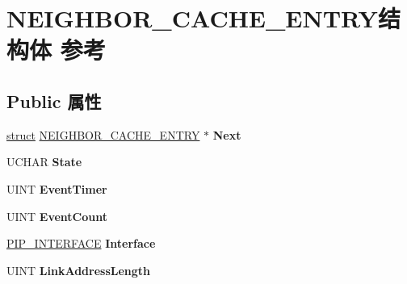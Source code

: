 \hypertarget{struct_n_e_i_g_h_b_o_r___c_a_c_h_e___e_n_t_r_y}{}\section{N\+E\+I\+G\+H\+B\+O\+R\+\_\+\+C\+A\+C\+H\+E\+\_\+\+E\+N\+T\+R\+Y结构体 参考}
\label{struct_n_e_i_g_h_b_o_r___c_a_c_h_e___e_n_t_r_y}
\subsection*{Public 属性}
\begin{DoxyCompactItemize}
\item 
\mbox{\label{struct_n_e_i_g_h_b_o_r___c_a_c_h_e___e_n_t_r_y_a687396e9a1ff02dbd81f290768274cf5}} 
\hyperlink{interfacestruct}{struct} \hyperlink{struct_n_e_i_g_h_b_o_r___c_a_c_h_e___e_n_t_r_y}{N\+E\+I\+G\+H\+B\+O\+R\+\_\+\+C\+A\+C\+H\+E\+\_\+\+E\+N\+T\+RY} $\ast$ {\bfseries Next}
\item 
\mbox{\label{struct_n_e_i_g_h_b_o_r___c_a_c_h_e___e_n_t_r_y_a7845157ad6f438f93650472e91eb9b49}} 
U\+C\+H\+AR {\bfseries State}
\item 
\mbox{\label{struct_n_e_i_g_h_b_o_r___c_a_c_h_e___e_n_t_r_y_a8cbe8f2c844743f428785ea9388fbaa1}} 
U\+I\+NT {\bfseries Event\+Timer}
\item 
\mbox{\label{struct_n_e_i_g_h_b_o_r___c_a_c_h_e___e_n_t_r_y_af28a74fa28e26b6522b275bf5fd246d1}} 
U\+I\+NT {\bfseries Event\+Count}
\item 
\mbox{\label{struct_n_e_i_g_h_b_o_r___c_a_c_h_e___e_n_t_r_y_a2e1998b273c34c4f11eb9c9c85a64b2a}} 
\hyperlink{struct___i_p___i_n_t_e_r_f_a_c_e}{P\+I\+P\+\_\+\+I\+N\+T\+E\+R\+F\+A\+CE} {\bfseries Interface}
\item 
\mbox{\label{struct_n_e_i_g_h_b_o_r___c_a_c_h_e___e_n_t_r_y_a83aa41fc6fb5ad489fcfbee1baa332a5}} 
U\+I\+NT {\bfseries Link\+Address\+Length}

\end{DoxyCompactItemize}
